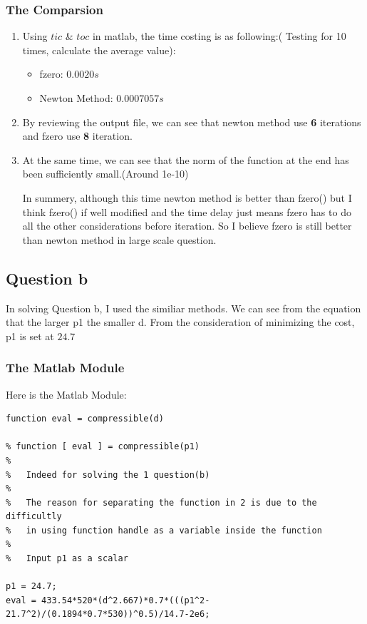 \documentclass[11pt]{article}
\begin{document}
\subsubsection{The Comparsion}
\begin{enumerate}
\item Using $tic$ \& $toc$ in matlab, the time costing is as following:( Testing for 10 times, calculate the average value):
    \begin{itemize}
    \item fzero: $0.0020s$
    \item Newton Method: $0.0007057s$
    \end{itemize}
\item By reviewing the output file, we can see that newton method use \textbf 6 iterations and fzero use \textbf 8 iteration.
\item At the same time, we can see that the norm of the function at the end has been sufficiently small.(Around 1e-10)

\begin{flushleft} In summery, although this time newton method is better than fzero() but I think fzero() if well modified and the time delay just means fzero has to do all the other considerations before iteration. So I believe fzero is still better than newton method in large scale question.
\end{flushleft}


\end{enumerate}

     

    
\subsection{Question b}

In solving Question b, I used the similiar methods. We can see from the equation that the larger p1 the smaller d. From the consideration of minimizing the cost, p1 is set at $24.7$

\subsubsection{The Matlab Module}

Here is the Matlab Module:
\begin{verbatim}
function eval = compressible(d)

% function [ eval ] = compressible(p1)
%
%   Indeed for solving the 1 question(b)
%
%   The reason for separating the function in 2 is due to the difficultly
%   in using function handle as a variable inside the function
%
%   Input p1 as a scalar 

p1 = 24.7;
eval = 433.54*520*(d^2.667)*0.7*(((p1^2-21.7^2)/(0.1894*0.7*530))^0.5)/14.7-2e6;

\end{verbatim}
\end{document}
